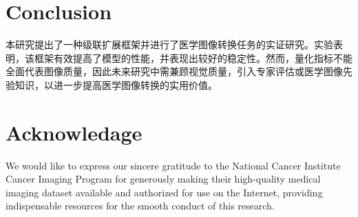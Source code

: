 \documentclass[twocolumn]{article}
\begin{document}


\section{Conclusion}
本研究提出了一种级联扩展框架并进行了医学图像转换任务的实证研究。实验表明，该框架有效提高了模型的性能，并表现出较好的稳定性。然而，量化指标不能全面代表图像质量，因此未来研究中需兼顾视觉质量，引入专家评估或医学图像先验知识，以进一步提高医学图像转换的实用价值。

\section*{Acknowledage}
We would like to express our sincere gratitude to the National Cancer Institute Cancer Imaging Program for generously making their high-quality medical imaging dataset available and authorized for use on the Internet, providing indispensable resources for the smooth conduct of this research.



\end{document}
